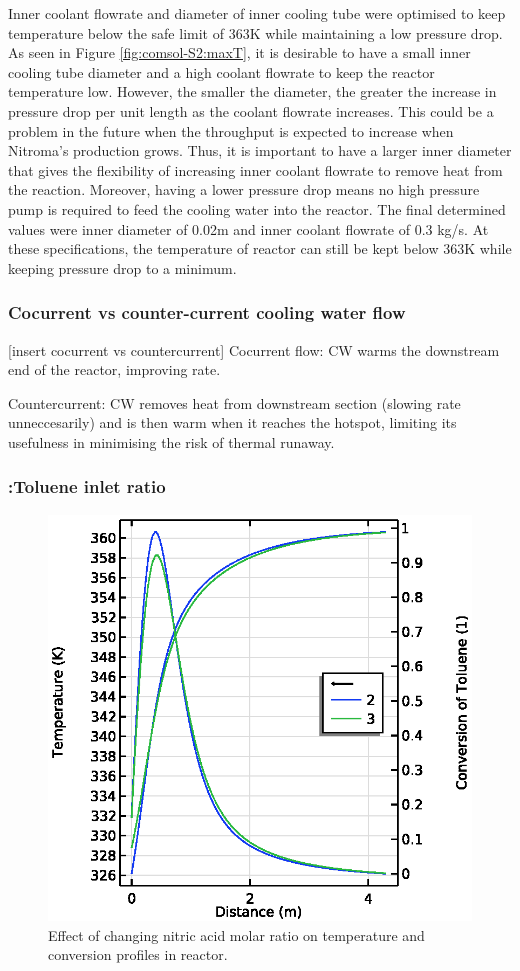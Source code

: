 Inner coolant flowrate and diameter of inner cooling tube were optimised to keep temperature below the safe limit of 363K while maintaining a low pressure drop. As seen in Figure \ref{fig:comsol-S2:maxT}, it is desirable to have a small inner cooling tube diameter and a high coolant flowrate to keep the reactor temperature low. However, the smaller the diameter, the greater the increase in pressure drop per unit length as the coolant flowrate increases. This could be a problem in the future when the throughput is expected to increase when Nitroma's production grows. Thus, it is important to have a larger inner diameter that gives the flexibility of increasing inner coolant flowrate to remove heat from the reaction. Moreover, having a lower pressure drop means no high pressure pump is required to feed the cooling water into the reactor. The final determined values were inner diameter of 0.02m and inner coolant flowrate of 0.3 kg/s. At these specifications, the temperature of reactor can still be kept below 363K while keeping pressure drop to a minimum.

\subsubsection{Cocurrent vs counter-current cooling water flow}
[insert cocurrent vs countercurrent]
Cocurrent flow: CW warms the downstream end of the reactor, improving rate.

Countercurrent: CW removes heat from downstream section (slowing rate unneccesarily) and is then warm when it reaches the hotspot, limiting its usefulness in minimising the risk of thermal runaway.

\subsubsection{:Toluene inlet ratio}

\begin{figure}[h]
    \centering
    \includegraphics[width=0.49\linewidth]{figures/S3-T-X.eps}
    \caption{Effect of changing nitric acid molar ratio on temperature and conversion profiles in reactor.}
    \label{fig:comsol-S3-T-X}
\end{figure}

